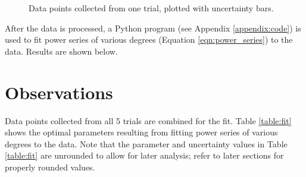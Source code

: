 \documentclass[aps,twocolumn,secnumarabic,nobalancelastpage,amsmath,amssymb,nofootinbib,floatfix]{revtex4}
\begin{document}
\begin{figure}[htb]
    \caption{Data points collected from one trial, plotted with uncertainty bars.}
    \label{fig:data1}
\end{figure}

After the data is processed, a Python program (see Appendix \ref{appendix:code}) is used to fit power series of various
degrees (Equation \ref{eqn:power_series}) to the data. Results are shown below.


\section{Observations}

Data points collected from all 5 trials are combined for the fit.
Table \ref{table:fit} shows the optimal parameters resulting from fitting power series of various degrees to the data.
Note that the parameter and uncertainty values in Table \ref{table:fit} are unrounded to allow for later analysis;
refer to later sections for properly rounded values.
\end{document}
